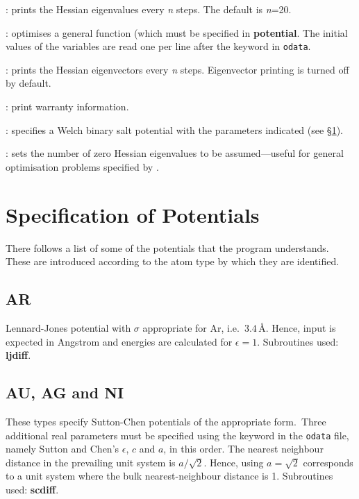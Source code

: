 {{{: prints the Hessian eigenvalues every {\it n\/} steps.
The default is {\it n\/}=20.

: optimises a general function (which must be specified in
{\bf potential}. The initial values of the variables are read one per line after the 
keyword in {\tt odata}.

: prints the Hessian eigenvectors every {\it n\/}
steps. Eigenvector printing is turned off by default.

: print warranty information.

: specifies a Welch binary
salt potential with the parameters indicated (see \S\ref{sec:potentials}).

: sets the number of zero Hessian eigenvalues to be
assumed---useful for general optimisation problems specified by {}. 

\section{Specification of Potentials}
\label{sec:potentials}
There follows a list of some of the 
potentials that the program understands. These are introduced according to the atom
type by which they are identified.

\subsection{AR}Lennard-Jones potential with $\sigma$ appropriate for Ar,
i.e.~$3.4\,$\AA. Hence, input is expected in Angstrom and energies are calculated
for $\epsilon=1$. Subroutines used: {\bf ljdiff}.

\subsection{AU, AG and NI}These types specify Sutton-Chen potentials of the appropriate
form.\cite{suttonc90}\ 
Three additional real parameters must be specified using the {} keyword
in the {\tt odata} file,
namely Sutton and Chen's $\epsilon$, $c$ and $a$, in this order.
The nearest neighbour distance in the prevailing unit system is $a/\sqrt{2}$. Hence,
using $a=\sqrt{2}$ corresponds to a unit system where the bulk nearest-neighbour distance is 1.
Subroutines used: {\bf scdiff}.

}}}
